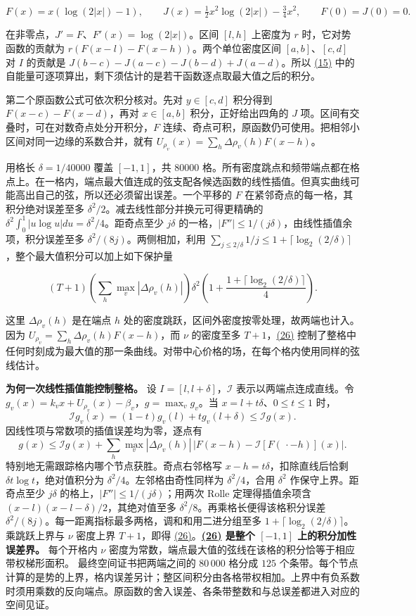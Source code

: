 \documentclass[11pt,a4paper]{article}
\begin{document}
\[
 F(x)=x(\log(2|x|)-1),\qquad J(x)=\tfrac12x^2\log(2|x|)-\tfrac34x^2,
 \qquad F(0)=J(0)=0 .
\]

在非零点，\(J'=F\)、\(F'(x)=\log(2|x|)\)。区间 \([l,h]\) 上密度为 \(r\) 时，它对势函数的贡献为 \(r(F(x-l)-F(x-h))\)。两个单位密度区间 \([a,b]\)、\([c,d]\) 对 \(I\) 的贡献是 \(J(b-c)-J(a-c)-J(b-d)+J(a-d)\)。所以 \hyperref[eq:15]{(15)} 中的自能量可逐项算出，剩下须估计的是若干函数逐点取最大值之后的积分。

第二个原函数公式可依次积分核对。先对 \(y\in[c,d]\) 积分得到 \(F(x-c)-F(x-d)\)，再对 \(x\in[a,b]\) 积分，正好给出四角的 \(J\) 项。区间有交叠时，可在对数奇点处分开积分，\(F\) 连续、奇点可积，原函数仍可使用。把相邻小区间对同一边缘的系数合并，就有 \(U_{\rho_v}(x)=\sum_h\Delta\rho_v(h)F(x-h)\)。

用格长 \(\delta=1/40000\) 覆盖 \([-1,1]\)，共 80000 格。所有密度跳点和频带端点都在格点上。在一格内，端点最大值连成的弦支配各候选函数的线性插值。但真实曲线可能高出自己的弦，所以还必须留出误差。一个平移的 \(F\) 在紧邻奇点的每一格，其积分绝对误差至多 \(\delta^2/2\)。减去线性部分并换元可得更精确的 \(\delta^2\int_0^1|u\log u|du=\delta^2/4\)。距奇点至少 \(j\delta\) 的一格，\(|F''|\le1/(j\delta)\)，由线性插值余项，积分误差至多 \(\delta^2/(8j)\)。两侧相加，利用 \(\sum_{j\le2/\delta}1/j\le1+\lceil\log_2(2/\delta)\rceil\)，整个最大值积分可以加上如下保护量

\[
 (T+1)\left(\sum_h\max_v|\Delta\rho_v(h)|\right)
 \delta^2\left(1+\frac{1+\lceil\log_2(2/\delta)\rceil}{4}\right).           \tag{26}\label{eq:26}
\]

这里 \(\Delta\rho_v(h)\) 是在端点 \(h\) 处的密度跳跃，区间外密度按零处理，故两端也计入。因为 \(U_{\rho_v}=\sum_h\Delta\rho_v(h)F(x-h)\)，而 \(\nu\) 的密度至多 \(T+1\)，\hyperref[eq:26]{(26)} 控制了整格中任何时刻成为最大值的那一条曲线。对带中心价格的场，在每个格内使用同样的弦线估计。

\textbf{为何一次线性插值能控制整格。} 设 \(I=[l,l+\delta]\)，\(\mathcal I\) 表示以两端点连成直线。令 \(g_v(x)=k_vx+U_{\rho_v}(x)-\beta_v\)，\(g=\max_vg_v\)。当 \(x=l+t\delta\)、\(0\le t\le1\) 时， \[
 \mathcal I g_v(x)=(1-t)g_v(l)+t g_v(l+\delta)\le\mathcal I g(x).
\] 因线性项与常数项的插值误差均为零，逐点有 \[
 g(x)\le\mathcal I g(x)+
 \sum_h \max_v|\Delta\rho_v(h)|\,\big|F(x-h)-\mathcal I[F(\,\cdot-h)](x)\big|.
\] 特别地无需跟踪格内哪个节点获胜。奇点右邻格写 \(x-h=t\delta\)，扣除直线后恰剩 \(\delta t\log t\)，绝对值积分为 \(\delta^2/4\)。左邻格由奇性同样为 \(\delta^2/4\)，合用 \(\delta^2\) 作保守上界。距奇点至少 \(j\delta\) 的格上，\(|F''|\le1/(j\delta)\)；用两次 Rolle 定理得插值余项含 \((x-l)(x-l-\delta)/2\)，其绝对值至多 \(\delta^2/8\)。再乘格长便得该格积分误差 \(\delta^2/(8j)\)。每一距离指标最多两格，调和和用二进分组至多 \(1+\lceil\log_2(2/\delta)\rceil\)。乘跳跃上界与 \(\nu\) 密度上界 \(T+1\)，即得 \hyperref[eq:26]{(26)}。\textbf{\hyperref[eq:26]{(26)} 是整个 \([-1,1]\) 上的积分加性误差界。} 每个开格内 \(\nu\) 密度为常数，端点最大值的弦线在该格的积分恰等于相应带权梯形面积。
最终空间证书把两端之间的 \(80\,000\) 格分成 \(125\) 个条带。每个节点计算的是势的上界，格内误差另计；整区间积分由各格带权相加。上界中有负系数时须用乘数的反向端点。原函数的舍入误差、各条带整数和与总误差都进入对应的空间见证。
\end{document}
